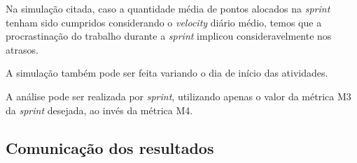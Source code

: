       		Na simulação citada, caso a quantidade média de pontos alocados na \textit{sprint} tenham sido cumpridos considerando 
      		o \textit{velocity} diário médio, temos que a procrastinação do trabalho durante a \textit{sprint} implicou
      		consideravelmente nos atrasos.

      		A simulação também pode ser feita variando o dia de início das atividades.

      		A análise pode ser realizada por \textit{sprint}, utilizando apenas o valor da métrica M3 da \textit{sprint} desejada, ao invés da métrica M4. 
      
      \subsection{Comunicação dos resultados}